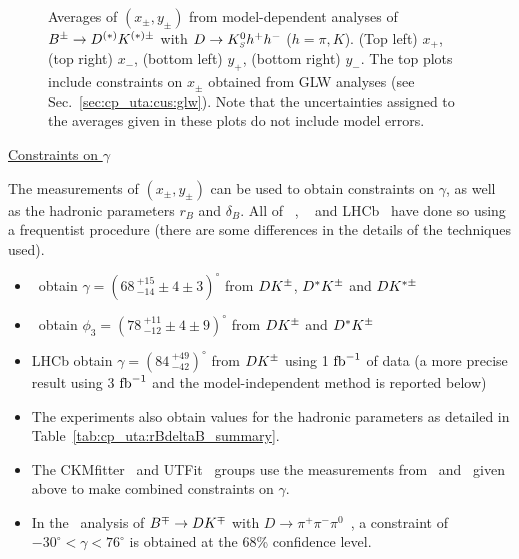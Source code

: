 \begin{figure}[htb]
\begin{center}
{    }
  \end{center}
  \vspace{-0.8cm}
  \caption{
    Averages of $(x_\pm, y_\pm)$ from model-dependent analyses of $B^\pm \to
    D^{(*)}K^{(*)\pm}$ with $D \to K^0_{\scriptscriptstyle S} h^+h^-$ ($h=\pi,K$).
    (Top left) $x_+$, (top right) $x_-$,
    (bottom left) $y_+$, (bottom right) $y_-$.
    The top plots include constraints on $x_{\pm}$ obtained from GLW analyses (see Sec.~\ref{sec:cp_uta:cus:glw}).
    Note that the uncertainties assigned to the averages given in these plots
    do not include model errors.        
  }
  \label{fig:cp_uta:cus:dalitz_1d}
\end{figure}

\vspace{3ex}

\noindent
\underline{Constraints on $\gamma$}

The measurements of $(x_\pm, y_\pm)$ can be used to obtain constraints on 
$\gamma$, as well as the hadronic parameters $r_B$ and $\delta_B$.
All of 
\babar~\cite{delAmoSanchez:2010rq},
\belle~\cite{Poluektov:2010wz,Poluektov:2006ia} and
LHCb~\cite{Aaij:2014iba}
have done so using a frequentist procedure 
(there are some differences in the details of the techniques used).

\begin{itemize}\setlength{\itemsep}{0.5ex}

\item 
  \babar\ obtain $\gamma = (68 \,^{+15}_{-14} \pm 4 \pm 3)^\circ$
  from $DK^\pm$, $D^*K^\pm$ and $DK^{*\pm}$

\item
  \belle\ obtain $\phi_3 = (78 \,^{+11}_{-12} \pm 4 \pm 9)^\circ$
  from $DK^\pm$ and $D^*K^\pm$

\item 
  LHCb obtain $\gamma = (84 \,^{+49}_{-42})^\circ$
  from $DK^\pm$ using 1 ${\rm fb}^{-1}$ of data (a more precise result using 3 ${\rm fb}^{-1}$ and the model-independent method is reported below)

\item
  The experiments also obtain values for the hadronic parameters as detailed
  in Table~\ref{tab:cp_uta:rBdeltaB_summary}.


\item 
  The CKMfitter~\cite{Charles:2004jd} and 
  UTFit~\cite{Bona:2005vz} groups use the measurements 
  from \belle\ and \babar\ given above
  to make combined constraints on $\gamma$.

\item 
  In the \babar\ analysis of $B^\mp \to DK^\mp$ with 
  $D \to \pi^+\pi^-\pi^0$~\cite{Aubert:2007ii},
  a constraint of $-30^\circ < \gamma < 76^\circ$ is obtained 
  at the 68\% confidence level.

\end{itemize}


